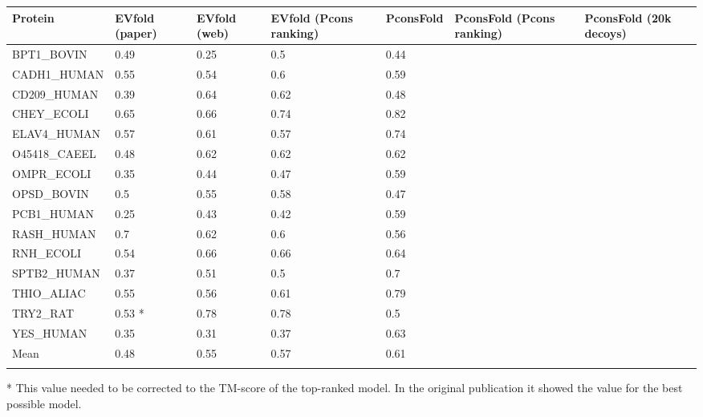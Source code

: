 \documentclass{bioinfo}
\begin{document}
\begin{table}[!t]
{\begin{tabular}{lllllll}\toprule
    Protein      & EVfold (paper) & EVfold (web) & EVfold (Pcons  ranking) & PconsFold & PconsFold (Pcons ranking) & PconsFold (20k decoys)\\\midrule
    BPT1\_BOVIN  & 0.49   & 0.25   & 0.5       & 0.44  & ~& ~    \\
    CADH1\_HUMAN & 0.55   & 0.54   &  0.6      & 0.59  & ~& ~    \\
    CD209\_HUMAN & 0.39   & 0.64  & 0.62         & 0.48  & ~& ~    \\
    CHEY\_ECOLI  & 0.65   & 0.66    & 0.74       & 0.82    & ~& ~  \\
    ELAV4\_HUMAN & 0.57   & 0.61    & 0.57       & 0.74   & ~& ~    \\
    O45418\_CAEEL & 0.48   & 0.62    &  0.62      & 0.62  & ~& ~    \\
    OMPR\_ECOLI  & 0.35   & 0.44   &  0.47       & 0.59    & ~& ~  \\
    OPSD\_BOVIN  & 0.5    & 0.55    &  0.58      & 0.47    & ~& ~  \\
    PCB1\_HUMAN  & 0.25   & 0.43   &  0.42       & 0.59  & ~& ~    \\
    RASH\_HUMAN  & 0.7    & 0.62   &  0.6       & 0.56  & ~& ~    \\
    RNH\_ECOLI   & 0.54   & 0.66    &  0.66      & 0.64    & ~& ~  \\
    SPTB2\_HUMAN & 0.37   & 0.51   & 0.5        & 0.7   & ~& ~    \\
    THIO\_ALIAC  & 0.55   & 0.56  & 0.61         & 0.79   & ~& ~   \\
    TRY2\_RAT    & 0.53 *  & 0.78   &  0.78      & 0.5   & ~& ~   \\
    YES\_HUMAN   & 0.35   & 0.31   &   0.37      & 0.63  & ~& ~    \\ \midrule
    Mean         & 0.48   & 0.55   & 0.57        & 0.61  & ~& ~    \\ \botrule
\end{tabular}}{* This value needed to be corrected to the TM-score of the top-ranked model. In the original publication it showed the value for the best possible model.}
\end{table}
\end{document}
